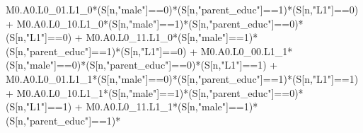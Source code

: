 \documentclass[
]{book}
\newenvironment{Shaded}{\begin{snugshade}}{\end{snugshade}}
\newcommand{\DecValTok}[1]{\textcolor[rgb]{0.00,0.00,0.81}{#1}}
\newcommand{\NormalTok}[1]{#1}
\newcommand{\SpecialCharTok}[1]{\textcolor[rgb]{0.00,0.00,0.00}{#1}}
\newcommand{\StringTok}[1]{\textcolor[rgb]{0.31,0.60,0.02}{#1}}
\begin{document}
\begin{Shaded}
\begin{Highlighting}[]
\NormalTok{          M0.A0.L0\_01.L1\_0}\SpecialCharTok{*}\NormalTok{(S[n,}\StringTok{"male"}\NormalTok{]}\SpecialCharTok{==}\DecValTok{0}\NormalTok{)}\SpecialCharTok{*}\NormalTok{(S[n,}\StringTok{"parent\_educ"}\NormalTok{]}\SpecialCharTok{==}\DecValTok{1}\NormalTok{)}\SpecialCharTok{*}\NormalTok{(S[n,}\StringTok{"L1"}\NormalTok{]}\SpecialCharTok{==}\DecValTok{0}\NormalTok{) }\SpecialCharTok{+}
\NormalTok{          M0.A0.L0\_10.L1\_0}\SpecialCharTok{*}\NormalTok{(S[n,}\StringTok{"male"}\NormalTok{]}\SpecialCharTok{==}\DecValTok{1}\NormalTok{)}\SpecialCharTok{*}\NormalTok{(S[n,}\StringTok{"parent\_educ"}\NormalTok{]}\SpecialCharTok{==}\DecValTok{0}\NormalTok{)}\SpecialCharTok{*}\NormalTok{(S[n,}\StringTok{"L1"}\NormalTok{]}\SpecialCharTok{==}\DecValTok{0}\NormalTok{) }\SpecialCharTok{+} 
\NormalTok{          M0.A0.L0\_11.L1\_0}\SpecialCharTok{*}\NormalTok{(S[n,}\StringTok{"male"}\NormalTok{]}\SpecialCharTok{==}\DecValTok{1}\NormalTok{)}\SpecialCharTok{*}\NormalTok{(S[n,}\StringTok{"parent\_educ"}\NormalTok{]}\SpecialCharTok{==}\DecValTok{1}\NormalTok{)}\SpecialCharTok{*}\NormalTok{(S[n,}\StringTok{"L1"}\NormalTok{]}\SpecialCharTok{==}\DecValTok{0}\NormalTok{) }\SpecialCharTok{+}
\NormalTok{          M0.A0.L0\_00.L1\_1}\SpecialCharTok{*}\NormalTok{(S[n,}\StringTok{"male"}\NormalTok{]}\SpecialCharTok{==}\DecValTok{0}\NormalTok{)}\SpecialCharTok{*}\NormalTok{(S[n,}\StringTok{"parent\_educ"}\NormalTok{]}\SpecialCharTok{==}\DecValTok{0}\NormalTok{)}\SpecialCharTok{*}\NormalTok{(S[n,}\StringTok{"L1"}\NormalTok{]}\SpecialCharTok{==}\DecValTok{1}\NormalTok{) }\SpecialCharTok{+}
\NormalTok{          M0.A0.L0\_01.L1\_1}\SpecialCharTok{*}\NormalTok{(S[n,}\StringTok{"male"}\NormalTok{]}\SpecialCharTok{==}\DecValTok{0}\NormalTok{)}\SpecialCharTok{*}\NormalTok{(S[n,}\StringTok{"parent\_educ"}\NormalTok{]}\SpecialCharTok{==}\DecValTok{1}\NormalTok{)}\SpecialCharTok{*}\NormalTok{(S[n,}\StringTok{"L1"}\NormalTok{]}\SpecialCharTok{==}\DecValTok{1}\NormalTok{) }\SpecialCharTok{+}
\NormalTok{          M0.A0.L0\_10.L1\_1}\SpecialCharTok{*}\NormalTok{(S[n,}\StringTok{"male"}\NormalTok{]}\SpecialCharTok{==}\DecValTok{1}\NormalTok{)}\SpecialCharTok{*}\NormalTok{(S[n,}\StringTok{"parent\_educ"}\NormalTok{]}\SpecialCharTok{==}\DecValTok{0}\NormalTok{)}\SpecialCharTok{*}\NormalTok{(S[n,}\StringTok{"L1"}\NormalTok{]}\SpecialCharTok{==}\DecValTok{1}\NormalTok{) }\SpecialCharTok{+}
\NormalTok{          M0.A0.L0\_11.L1\_1}\SpecialCharTok{*}\NormalTok{(S[n,}\StringTok{"male"}\NormalTok{]}\SpecialCharTok{==}\DecValTok{1}\NormalTok{)}\SpecialCharTok{*}\NormalTok{(S[n,}\StringTok{"parent\_educ"}\NormalTok{]}\SpecialCharTok{==}\DecValTok{1}\NormalTok{)}\SpecialCharTok{*}

\end{Highlighting}
\end{Shaded}
\end{document}
